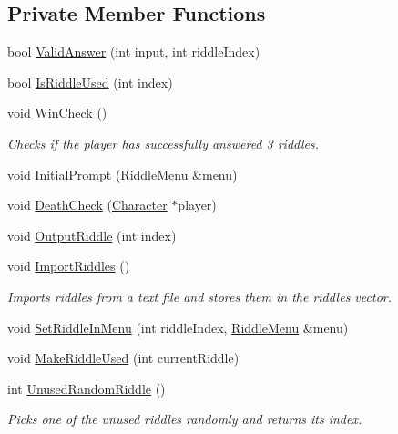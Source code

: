 \subsection*{Private Member Functions}
\begin{DoxyCompactItemize}
\item 
bool \hyperlink{classCodeCracker_aeddf29fcc2034f0acb41d41e0f755a3c}{Valid\-Answer} (int input, int riddle\-Index)
\item 
bool \hyperlink{classCodeCracker_a5540b8495c5f97f92cdb9b56a6005e6a}{Is\-Riddle\-Used} (int index)
\item 
void \hyperlink{classCodeCracker_a3177ddb9deb208ac462d55970b112626}{Win\-Check} ()
\begin{DoxyCompactList}\small\item\em Checks if the player has successfully answered 3 riddles. \end{DoxyCompactList}\item 
void \hyperlink{classCodeCracker_a879d3725e5602f6a5feddc39808f49b2}{Initial\-Prompt} (\hyperlink{classRiddleMenu}{Riddle\-Menu} \&menu)
\item 
void \hyperlink{classCodeCracker_aa3e32b1d98fe1935315d02c832877e33}{Death\-Check} (\hyperlink{classCharacter}{Character} $\ast$player)
\item 
void \hyperlink{classCodeCracker_a02a6f156f051feca5691b8a4c4f44310}{Output\-Riddle} (int index)
\item 
void \hyperlink{classCodeCracker_a13ef45a98032d321c825e7a2c5439a33}{Import\-Riddles} ()
\begin{DoxyCompactList}\small\item\em Imports riddles from a text file and stores them in the riddles vector. \end{DoxyCompactList}\item 
void \hyperlink{classCodeCracker_a98c0c73ba7bc17e56a8a913ada09955f}{Set\-Riddle\-In\-Menu} (int riddle\-Index, \hyperlink{classRiddleMenu}{Riddle\-Menu} \&menu)
\item 
void \hyperlink{classCodeCracker_a23587f975c42657b90e78d00cf93bd38}{Make\-Riddle\-Used} (int current\-Riddle)
\item 
int \hyperlink{classCodeCracker_a55bebba723a92d780659f016e9e394e4}{Unused\-Random\-Riddle} ()
\begin{DoxyCompactList}\small\item\em Picks one of the unused riddles randomly and returns its index. \end{DoxyCompactList}\end{DoxyCompactItemize}
